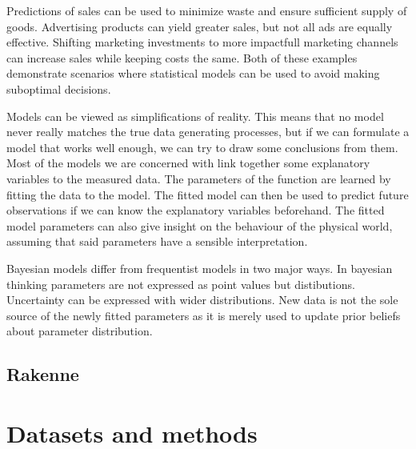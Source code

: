 \documentclass[english, 12pt, a4paper, sci, utf8, a-1b, online]{aaltothesis}
\begin{document}




Predictions of sales can be used
to minimize waste and ensure sufficient supply of goods. Advertising products can yield greater sales,
but not all ads are equally effective. Shifting marketing investments to more impactfull marketing channels
can increase sales while keeping costs the same. Both of these examples demonstrate scenarios where statistical models can be used to
avoid making suboptimal decisions.

Models can be viewed as simplifications of reality. This means that no model never really matches the true data generating processes, 
but if we can formulate a model that works well enough, we can try to draw some conclusions from them. Most of the models we are concerned with
link together some explanatory variables to the measured data. The parameters of the function are learned by fitting the data to the model.
The fitted model can then be used to predict future observations if we can know the explanatory variables beforehand. The fitted model parameters
can also give insight on the behaviour of the physical world, assuming that said parameters have a sensible interpretation.

Bayesian models differ from frequentist models in two major ways. In bayesian thinking parameters are not expressed as point values but distibutions.
Uncertainty can be expressed with wider distributions. New data is not the sole source of the newly fitted parameters as it is merely used to
update prior beliefs about parameter distribution. 






\subsection{Rakenne}

\section{Datasets and methods}

\end{document}
